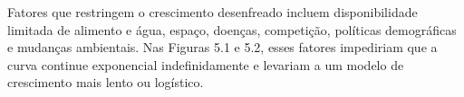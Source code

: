 Fatores que restringem o crescimento desenfreado incluem disponibilidade limitada de alimento e água, espaço, doenças, competição, políticas demográficas e mudanças ambientais. Nas Figuras 5.1 e 5.2, esses fatores impediriam que a curva continue exponencial indefinidamente e levariam a um modelo de crescimento mais lento ou logístico.